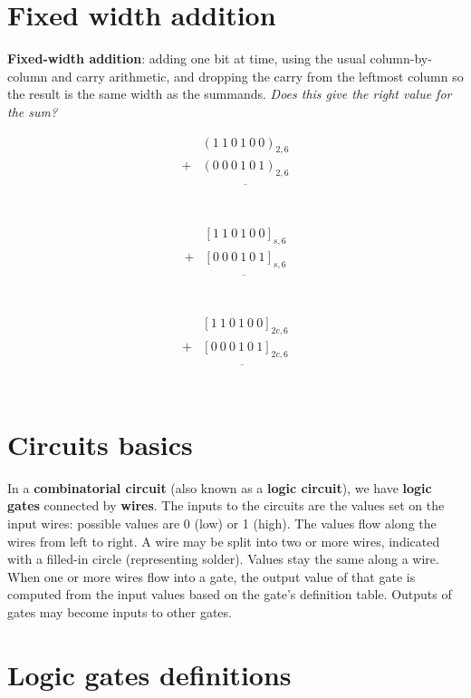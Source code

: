 \documentclass[12pt, oneside]{article}
\begin{document}
\section*{Fixed width addition}


{\bf Fixed-width addition}: adding one bit at time, using the usual column-by-column and carry arithmetic, and dropping the carry from the leftmost column so the result is the same width as the summands.  {\it Does this give the right value for the sum?}
\begin{multicols}{3}
\begin{align*}
   & (1~ 1~ 0~ 1~ 0~ 0)_{2,6}\\
+ & (0~ 0~ 0~ 1~ 0~ 1)_{2,6}\\
&\overline{\phantom{(1~1~1~0~0~1)_{2,6}}}\\
\end{align*}

\begin{align*}
   & [1~ 1~ 0~ 1~ 0~ 0]_{s,6}\\
+ & [0~ 0~ 0~ 1~ 0~ 1]_{s,6}\\
&\overline{\phantom{(1~1~1~0~0~1)_2}}\\
\end{align*}

\begin{align*}
   & [1~ 1~ 0~ 1~ 0~ 0]_{2c,6}\\
+ & [0~ 0~ 0~ 1~ 0~ 1]_{2c,6}\\
&\overline{\phantom{(1~1~1~0~0~1)_2}}\\
\end{align*}
\end{multicols} \vfill
\section*{Circuits basics}


In a {\bf combinatorial circuit} (also known as
a {\bf logic circuit}), we have {\bf logic gates} 
connected
by {\bf wires}. The inputs to the circuits are the 
values set on the input wires: possible
values are 0 (low) or 1 (high). The values
flow along the wires from left to right.
A wire may be split into two or more wires, 
indicated with a filled-in circle (representing
solder). Values stay the same along a wire. When 
one or more wires flow into a gate, the output 
value of that gate is computed
from the input values based on the gate's definition
table. Outputs of gates may become inputs to other
gates.  \vfill
\section*{Logic gates definitions}
\end{document}
